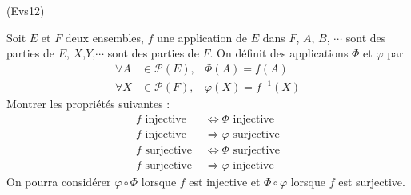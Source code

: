 \begin{tiny}(Evs12)\end{tiny} Soit $E$ et $F$ deux ensembles, $f$ une application de $E$ dans $F$, $A$, $B$, $\cdots $ sont des parties de $E$, $X$,$Y$,$\cdots $ sont des parties de $F$. On d{\'e}finit des applications $\Phi $ et $\varphi $ par
\begin{align*}
\forall A &\in \mathcal{P}(E),& \Phi (A)=f(A) \\
\forall X &\in \mathcal{P}(F),& \varphi (X)=f^{-1}(X)
\end{align*}
Montrer les propri{\'e}t{\'e}s suivantes :
\begin{align*}
f\text{ injective } &\Leftrightarrow \Phi \text{ injective} \\
f\text{ injective } &\Rightarrow \varphi \text{ surjective} \\
f\text{ surjective } &\Leftrightarrow \Phi \text{ surjective} \\
f\text{ surjective } &\Rightarrow \varphi \text{ injective}
\end{align*}
On pourra consid{\'e}rer $\varphi \circ \Phi $ lorsque $f$ est injective et $\Phi \circ \varphi $ lorsque $f$ est surjective.